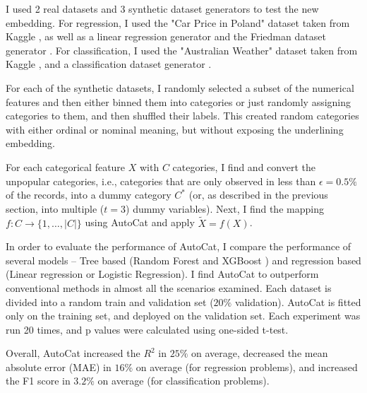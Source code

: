 \documentclass{article}
\begin{document}
I used 2 real datasets and 3 synthetic dataset generators to test the new embedding. For regression, I used the "Car Price in Poland" dataset taken from Kaggle \cite{carPricesPoland}, as well as a linear regression generator and the Friedman dataset generator \cite{Friedman1991}. For classification, I used the "Australian Weather" dataset taken from Kaggle \cite{rainInAustralia}, and a classification dataset generator \cite{scikit-learn}.

For each of the synthetic datasets, I randomly selected a subset of the numerical features and then either binned them into categories or just randomly assigning categories to them, and then shuffled their labels. This created random categories with either ordinal or nominal meaning, but without exposing the underlining embedding.

For each categorical feature $X$ with $C$ categories, I find and convert the unpopular categories, i.e., categories that are only observed in less than $\epsilon = 0.5\%$ of the records, into a dummy category $C^*$ (or, as described in the previous section, into multiple ($t=3$) dummy variables). Next, I find the mapping $f: C\to \{1,\dots, |C|\}$ using AutoCat and apply $\tilde{X} = f(X)$.

In order to evaluate the performance of AutoCat, I compare the performance of several models -- Tree based (Random Forest \cite{Ho95} and XGBoost \cite{Chen:2016:XST:2939672.2939785}) and regression based (Linear regression or Logistic Regression). I find AutoCat to outperform conventional methods in almost all the scenarios examined. Each dataset is divided into a random train and validation set ($20\%$ validation). AutoCat is fitted only on the training set, and deployed on the validation set. Each experiment was run 20 times, and p values were calculated using one-sided t-test. 

Overall, AutoCat increased the $R^2$ in $25\%$ on average, decreased the mean absolute error (MAE) in $16\%$ on average (for regression problems), and increased the F1 score in $3.2\%$ on average (for classification problems).
\end{document}
